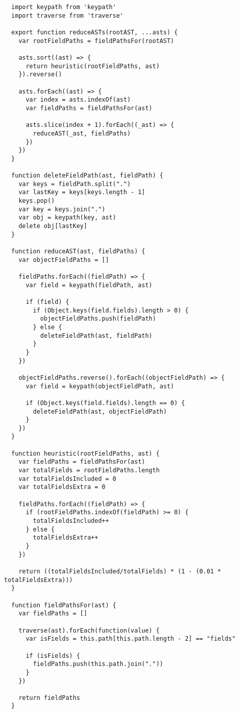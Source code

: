 \begin{verbatim}
  import keypath from 'keypath'
  import traverse from 'traverse'

  export function reduceASTs(rootAST, ...asts) {
    var rootFieldPaths = fieldPathsFor(rootAST)

    asts.sort((ast) => {
      return heuristic(rootFieldPaths, ast)
    }).reverse()

    asts.forEach((ast) => {
      var index = asts.indexOf(ast)
      var fieldPaths = fieldPathsFor(ast)

      asts.slice(index + 1).forEach((_ast) => {
        reduceAST(_ast, fieldPaths)
      })
    })
  }

  function deleteFieldPath(ast, fieldPath) {
    var keys = fieldPath.split(".")
    var lastKey = keys[keys.length - 1]
    keys.pop()
    var key = keys.join(".")
    var obj = keypath(key, ast)
    delete obj[lastKey]
  }

  function reduceAST(ast, fieldPaths) {
    var objectFieldPaths = []

    fieldPaths.forEach((fieldPath) => {
      var field = keypath(fieldPath, ast)

      if (field) {
        if (Object.keys(field.fields).length > 0) {
          objectFieldPaths.push(fieldPath)
        } else {
          deleteFieldPath(ast, fieldPath)
        }
      }
    })

    objectFieldPaths.reverse().forEach((objectFieldPath) => {
      var field = keypath(objectFieldPath, ast)

      if (Object.keys(field.fields).length == 0) {
        deleteFieldPath(ast, objectFieldPath)
      }
    })
  }

  function heuristic(rootFieldPaths, ast) {
    var fieldPaths = fieldPathsFor(ast)
    var totalFields = rootFieldPaths.length
    var totalFieldsIncluded = 0
    var totalFieldsExtra = 0

    fieldPaths.forEach((fieldPath) => {
      if (rootFieldPaths.indexOf(fieldPath) >= 0) {
        totalFieldsIncluded++
      } else {
        totalFieldsExtra++
      }
    })

    return ((totalFieldsIncluded/totalFields) * (1 - (0.01 * totalFieldsExtra)))
  }

  function fieldPathsFor(ast) {
    var fieldPaths = []

    traverse(ast).forEach(function(value) {
      var isFields = this.path[this.path.length - 2] == "fields"

      if (isFields) {
        fieldPaths.push(this.path.join("."))
      }
    })

    return fieldPaths
  }
\end{verbatim}
